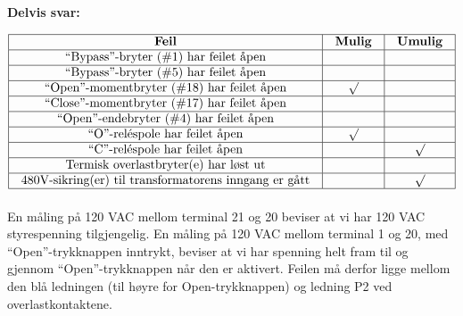 





\noindent
{\bf Delvis svar:}


$$\vbox{\offinterlineskip
\halign{\strut
\vrule \quad\hfil # \ \hfil & 
\vrule \quad\hfil # \ \hfil & 
\vrule \quad\hfil # \ \hfil \vrule \cr
\noalign{\hrule}
%
{\bf Feil} & {\bf Mulig} & {\bf Umulig} \cr
%
\noalign{\hrule}
%
``Bypass''-bryter (\#1) har feilet åpen &  &  \cr
%
\noalign{\hrule}
%
``Bypass''-bryter (\#5) har feilet åpen &  &  \cr
%
\noalign{\hrule}
%
``Open''-momentbryter (\#18) har feilet åpen & $\surd$ &  \cr
%
\noalign{\hrule}
%
``Close''-momentbryter (\#17) har feilet åpen &  &  \cr
%
\noalign{\hrule}
%
``Open''-endebryter (\#4) har feilet åpen &  &  \cr
%
\noalign{\hrule}
%
``O''-reléspole har feilet åpen & $\surd$ &  \cr
%
\noalign{\hrule}
%
``C''-reléspole har feilet åpen &  & $\surd$ \cr
%
\noalign{\hrule}
%
Termisk overlastbryter(e) har løst ut &  &  \cr
%
\noalign{\hrule}
%
480V-sikring(er) til transformatorens inngang er gått &  & $\surd$ \cr
%
\noalign{\hrule}
} %
}$$ %







En måling på 120 VAC mellom terminal 21 og 20 beviser at vi har 120 VAC styrespenning tilgjengelig. En måling på 120 VAC mellom terminal 1 og 20, med ``Open''-trykknappen inntrykt, beviser at vi har spenning helt fram til og gjennom ``Open''-trykknappen når den er aktivert. Feilen må derfor ligge mellom den blå ledningen (til høyre for Open-trykknappen) og ledning P2 ved overlastkontaktene.



